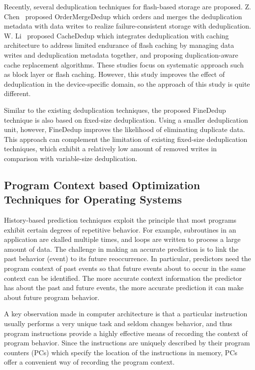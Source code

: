 Recently, several deduplication techniques for flash-based storage are proposed. Z. Chen~\cite{order-merge}
proposed OrderMergeDedup which orders and merges the deduplication metadata with data writes to 
realize failure-consistent storage with deduplication.  
W. Li~\cite{cachededup} proposed CacheDedup which integrates deduplication with caching architecture to 
address limited endurance of flash caching by managing data writes and deduplication metadata together, 
and proposing duplication-aware cache replacement algorithms. 
These studies focus on systematic approach such as block layer or flash caching. 
However, this study improves the effect of deduplication in the device-specific domain, 
so the approach of this study is quite different.

Similar to the existing deduplication techniques,
the proposed FineDedup technique is also based on fixed-size deduplication.
Using a smaller deduplication unit,
however, FineDedup improves the likelihood of eliminating duplicate data.
This approach can complement the limitation of existing fixed-size deduplication techniques,
which exhibit a relatively low amount of removed writes 
in comparison with variable-size deduplication.

\subsection{Program Context based Optimization Techniques for Operating Systems}
History-based prediction techniques exploit the principle
that most programs exhibit certain degrees of repetitive
behavior. For example, subroutines in an application are
ckalled multiple times, and loops are written to process a
large amount of data. The challenge in making an accurate
prediction is to link the past behavior (event) to
its future reoccurrence. In particular, predictors need the
program context of past events so that future events about
to occur in the same context can be identified. The more
accurate context information the predictor has about the
past and future events, the more accurate prediction it can
make about future program behavior.

A key observation made in computer architecture is that
a particular instruction usually performs a very unique
task and seldom changes behavior, and thus program instructions
provide a highly effective means of recording
the context of program behavior. Since the instructions
are uniquely described by their program counters (PCs)
which specify the location of the instructions in memory,
PCs offer a convenient way of recording the program context.

